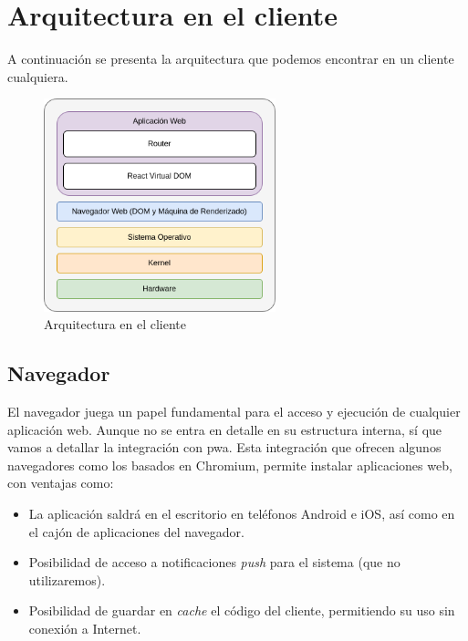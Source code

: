 \section{Arquitectura en el cliente}

A continuación se presenta la arquitectura que podemos encontrar en un cliente cualquiera.

\begin{figure}[H]
	\centering
	\includegraphics[width=0.6\textwidth]{img/client.png}
	\caption{Arquitectura en el cliente}
	\label{fig:chap4:architecture_client}
\end{figure}


\subsection{Navegador}

El navegador juega un papel fundamental para el acceso y ejecución de cualquier aplicación web. Aunque no se entra en detalle en su estructura interna, sí que vamos a detallar la integración con \acrfull{pwa}. Esta integración que ofrecen algunos navegadores como los basados en Chromium, permite instalar aplicaciones web, con ventajas como:

\begin{itemize}
	\item La aplicación saldrá en el escritorio en teléfonos Android e iOS, así como en el cajón de aplicaciones del navegador.
	\item Posibilidad de acceso a notificaciones \textit{push} para el sistema (que no utilizaremos).
	\item Posibilidad de guardar en \textit{cache} el código del cliente, permitiendo su uso sin conexión a Internet.
\end{itemize}

